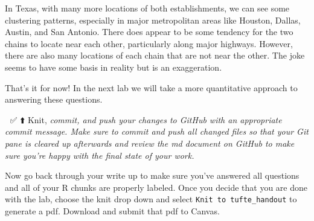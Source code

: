 \documentclass[
]{article}
\begin{document}
In Texas, with many more locations of both establishments, we can see
some clustering patterns, especially in major metropolitan areas like
Houston, Dallas, Austin, and San Antonio. There does appear to be some
tendency for the two chains to locate near each other, particularly
along major highways. However, there are also many locations of each
chain that are not near the other. The joke seems to have some basis in
reality but is an exaggeration.

That's it for now! In the next lab we will take a more quantitative
approach to answering these questions.

🧶 ✅ ⬆️ Knit, \emph{commit, and push your changes to GitHub with an
appropriate commit message. Make sure to commit and push all changed
files so that your Git pane is cleared up afterwards and review the md
document on GitHub to make sure you're happy with the final state of
your work.}

Now go back through your write up to make sure you've answered all
questions and all of your R chunks are properly labeled. Once you decide
that you are done with the lab, choose the knit drop down and select
\texttt{Knit\ to\ tufte\_handout} to generate a pdf. Download and submit
that pdf to Canvas.
\end{document}
